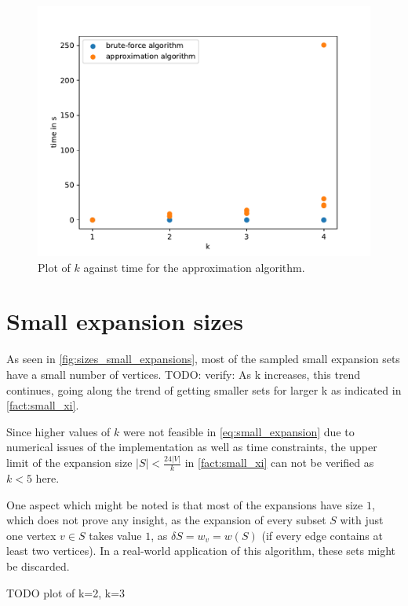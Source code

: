 \begin{figure}
	\centering
	\includegraphics[scale=0.8]{figures/k_all_logs.pdf}
	\caption[Plot k time ]{Plot of $k$ against time for the approximation algorithm.\label{fig:k_time}}
\end{figure}

\section{Small expansion sizes}

As seen in \cref{fig:sizes_small_expansions}, most of the sampled small expansion sets have a small number of vertices. TODO: verify: As k increases, this trend continues, going along the trend of getting smaller sets for larger k as indicated in \cref{fact:small_xi}.


Since higher values of $k$ were not feasible in \cref{eq:small_expansion} due to numerical issues of the implementation as well as time constraints, the upper limit of the expansion size $|S|<\frac{24|V|}{k}$ in \cref{fact:small_xi} can not be verified as $k<5$ here.

One aspect which might be noted is that most of the expansions have size $1$, which does not prove any insight, as the expansion of every subset $S$ with just one vertex $v\in S$ takes value $1$, as $\delta S = w_v = w(S)$ (if every edge contains at least two vertices). In a real-world application of this algorithm, these sets might be discarded.


TODO plot of k=2, k=3

